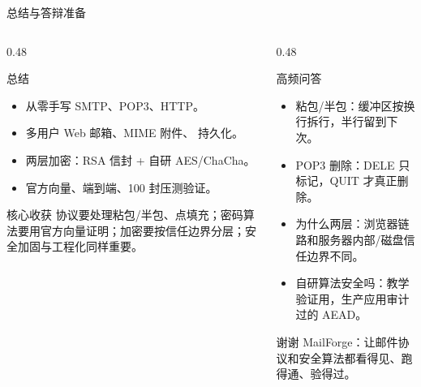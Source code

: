 \documentclass[aspectratio=169,10pt]{beamer}
\newcommand{\code}[1]{\texttt{\small\detokenize{#1}}}
\begin{document}
\begin{frame}{总结与答辩准备}
  \begin{columns}[T]
    \begin{column}{0.48\textwidth}
      \begin{block}{总结}
        \small
        \begin{itemize}
          \item 从零手写 SMTP、POP3、HTTP。
          \item 多用户 Web 邮箱、MIME 附件、\code{.eml} 持久化。
          \item 两层加密：RSA 信封 + 自研 AES/ChaCha。
          \item 官方向量、端到端、100 封压测验证。
        \end{itemize}
      \end{block}
      \begin{block}{核心收获}
        \small
        协议要处理粘包/半包、点填充；密码算法要用官方向量证明；加密要按信任边界分层；安全加固与工程化同样重要。
      \end{block}
    \end{column}
    \begin{column}{0.48\textwidth}
      \begin{block}{高频问答}
        \small
        \begin{itemize}
          \item 粘包/半包：缓冲区按换行拆行，半行留到下次。
          \item POP3 删除：DELE 只标记，QUIT 才真正删除。
          \item 为什么两层：浏览器链路和服务器内部/磁盘信任边界不同。
          \item 自研算法安全吗：教学验证用，生产应用审计过的 AEAD。
        \end{itemize}
      \end{block}
      \begin{block}{谢谢}
        \centering
        MailForge：让邮件协议和安全算法都看得见、跑得通、验得过。
      \end{block}
    \end{column}
  \end{columns}
\end{frame}
\end{document}

